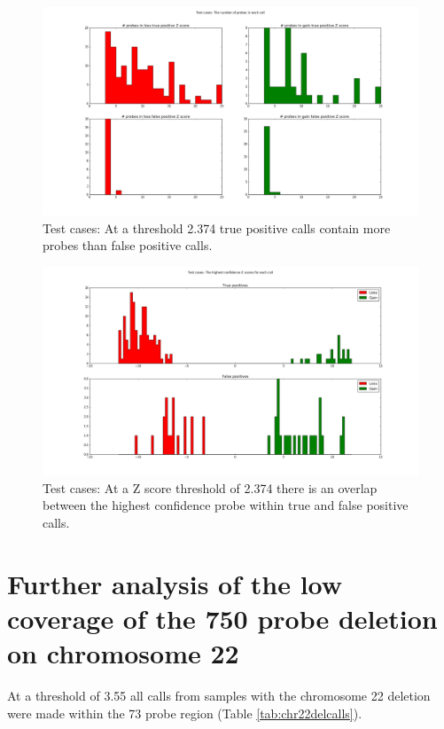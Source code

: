 \begin{figure}
\centering
\includegraphics[width=1\linewidth]{./Figures/testcasesprobecount}
\caption[Test cases: The number of probes within calls made at a threshold of 2.374]{Test cases: At a threshold 2.374 true positive calls contain more probes than false positive calls.}
\label{fig:testcasesprobecount}
\end{figure}

\begin{figure}
\centering
\includegraphics[width=1\linewidth]{./Figures/testcaseshighestconfidenceZscore}
\caption[Test cases: The highest confidence probe within calls made at a threshold of 2.374]{Test cases: At a Z score threshold of 2.374 there is an overlap between the highest confidence probe within true and false positive calls.}
\label{fig:testcaseshighestconfidenceZscore}
\end{figure}


\section{Further analysis of the low coverage of the 750 probe deletion on chromosome 22}\label{ch:analysisof22del}
At a threshold of 3.55 all calls from samples with the chromosome 22 deletion were made within the 73 probe region (Table  \ref{tab:chr22delcalls}).


